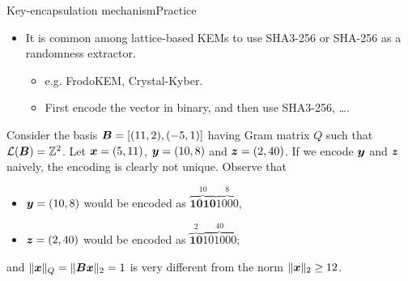 \documentclass[10pt]{beamer}
\begin{document}
\begin{frame}{Key-encapsulation mechanism}{Practice}
				\begin{itemize}
								\item It is common among lattice-based KEMs to use SHA3-256 or SHA-256 as a randomness extractor.
												\begin{itemize}
																\item e.g. FrodoKEM, Crystal-Kyber.
																\item First encode the vector in binary, and then use SHA3-256, \ldots.
												\end{itemize}
				\end{itemize}


				\begin{example}
								Consider the basis $\boldsymbol{B} = [(11, 2), (-5, 1)]$ having Gram matrix $Q$ such that $\mathcal{L}(\boldsymbol{B}) = \mathbb{Z}^{2}$. Let $\boldsymbol{x} = (5, 11)$, $\boldsymbol{y} = (10, 8)$ and $\boldsymbol{z} = (2, 40)$. If we encode $\boldsymbol{y}$ and $\boldsymbol{z}$ naively, the encoding is clearly not unique. Observe that

								\begin{itemize}
												\item $\boldsymbol{y} = (10, 8)$ would be encoded as $\overbrace{\boldsymbol{1010}}^{10}\overbrace{1000}^{8}$,
												\item $\boldsymbol{z} = (2, 40)$ would be encoded as $\overbrace{\boldsymbol{10}}^{2}\overbrace{101000}^{40}$;
								\end{itemize}

								and $\| \boldsymbol{x} \|_{Q} = \| \boldsymbol{B} \boldsymbol{x} \|_{2} = 1$ is very different from the norm $\| \boldsymbol{x} \|_{2} \geq 12 $.
				\end{example}
\end{frame}
\end{document}
